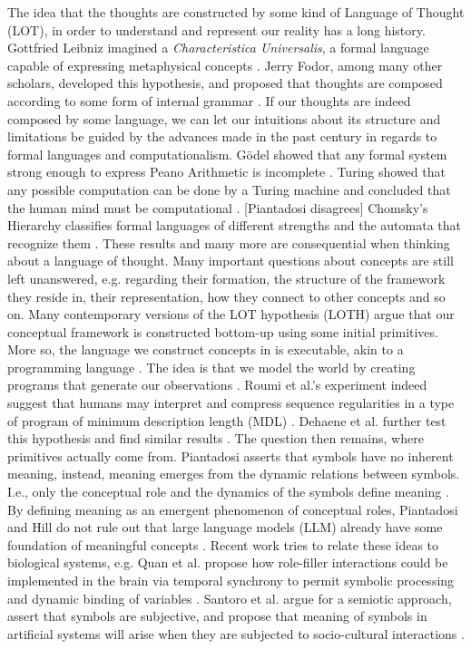 The idea that the thoughts are constructed by some kind of Language of Thought (LOT), in order to understand and represent our reality has a long history. 
Gottfried Leibniz imagined a \textit{Characteristica Universalis}, a formal language capable of expressing metaphysical concepts \cite{sep-leibniz-logic-influence}.
Jerry Fodor, among many other scholars, developed this hypothesis, and proposed that thoughts are composed according to some form of internal grammar \cite{sep-language-thought}.
If our thoughts are indeed composed by some language, we can let our intuitions about its structure and limitations be guided by the advances made in the past century in regards to formal languages and computationalism.
Gödel showed that any formal system strong enough to express Peano Arithmetic is incomplete \cite{sep-goedel-incompleteness}. Turing showed that any possible computation can be done by a Turing machine and concluded that the human mind must be computational \cite{JCopeland2004-JCOTET}. [Piantadosi disagrees] 
Chomsky's Hierarchy classifies formal languages of different strengths and the automata that recognize them \cite{chomsky1959certain}.
These results and many more are consequential when thinking about a language of thought.
Many important questions about concepts are still left unanswered, e.g. regarding their formation, the structure of the framework they reside in, their representation, how they connect to other concepts and so on. 
Many contemporary versions of the LOT hypothesis (LOTH) argue that our conceptual framework is constructed bottom-up using some initial primitives. More so, the language we construct concepts in is executable, akin to a programming language \cite{dehaene_symbols_2022}. The idea is that we model the world by creating programs that generate our observations \cite{rule_child_2020}. 
Roumi et al.'s experiment indeed suggest that humans may interpret and compress sequence regularities in a type of program of minimum description length (MDL) \cite{al_roumi_mental_2021}.
Dehaene et al. further test this hypothesis and find similar results \cite{dehaene_symbols_2022}.
The question then remains, where primitives actually come from.
Piantadosi asserts that symbols have no inherent meaning, instead, meaning emerges from the dynamic relations between symbols. I.e., only the conceptual role and the dynamics of the symbols define meaning \cite{piantadosi2021computational}.
By defining meaning as an emergent phenomenon of conceptual roles, Piantadosi and Hill do not rule out that large language models (LLM) already have some foundation of meaningful concepts \cite{piantasodi2022meaning}.
Recent work tries to relate these ideas to biological systems, e.g. Quan et al. propose how role-filler interactions could be implemented in the brain via temporal synchrony to permit symbolic processing and dynamic binding of variables \cite{do2021neural}.
Santoro et al. argue for a semiotic approach, assert that symbols are subjective, and propose that meaning of symbols in artificial systems will arise when they are subjected to socio-cultural interactions \cite{santoro2021symbolic}.

